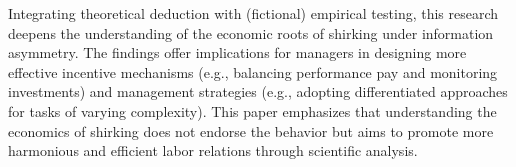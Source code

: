 \begin{eabstract}
	Integrating theoretical deduction with (fictional) empirical testing, this research deepens the understanding of the economic roots of {shirking} under {information asymmetry}. The findings offer implications for managers in designing more effective {incentive} mechanisms (e.g., balancing performance pay and monitoring investments) and management strategies (e.g., adopting differentiated approaches for tasks of varying complexity). This paper emphasizes that understanding the economics of {shirking} does not endorse the behavior but aims to promote more harmonious and efficient labor relations through scientific analysis.
\end{eabstract}

